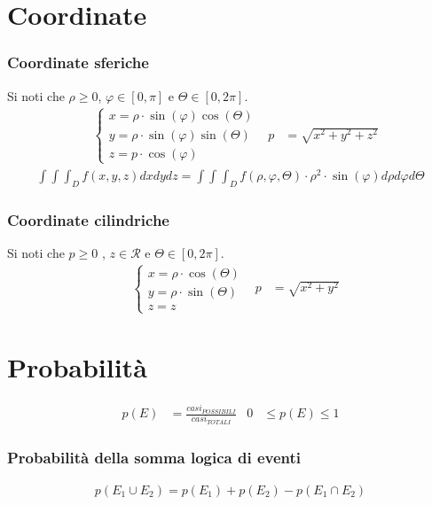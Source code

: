 \documentclass[a4paper]{article}
\begin{document}
			\section{Coordinate}
			\subsubsection*{Coordinate sferiche}
			Si noti che $\rho \ge 0$, $\varphi \in [0,\pi]$ e $\varTheta \in [0,2\pi]$.
			\begin{align*}
				&\begin{cases}
					x = \rho \cdot \sin(\varphi)\cos(\varTheta)\\
					y = \rho \cdot \sin(\varphi)\sin(\varTheta)\\
					z = p \cdot \cos(\varphi)
				\end{cases}	&	p &= \sqrt{x^2+y^2+z^2}
			\end{align*}
			\begin{align*}
				\int \int \int_{D}f(x,y,z)dxdydz = \int \int \int_D f(\rho,\varphi,\varTheta) \cdot \rho^2 \cdot \sin(\varphi) d\rho d\varphi d\varTheta
			\end{align*}
			\subsubsection*{Coordinate cilindriche}
			Si noti che $p \ge 0$ , $z \in \mathcal{R}$ e $\varTheta \in [0,2\pi]$.
			\begin{align*}
				&\begin{cases}
				x = \rho \cdot \cos(\varTheta)\\
				y = \rho \cdot \sin(\varTheta)\\
				z=z
				\end{cases}	&	p &= \sqrt{x^2+y^2}
			\end{align*}
	
	\newpage
	\section{Probabilità}
	\begin{align*}
		p(E) & = \frac{casi_{POSSIBILI}}{casi_{TOTALI}} & 0 & \le p(E) \le 1
	\end{align*}
	
	\subsubsection*{Probabilità della somma logica di eventi}
	\begin{align*}
		p(E_1 \cup E_2) = p(E_1) + p(E_2) - p(E_1 \cap E_2)
	\end{align*}
	
\end{document}
